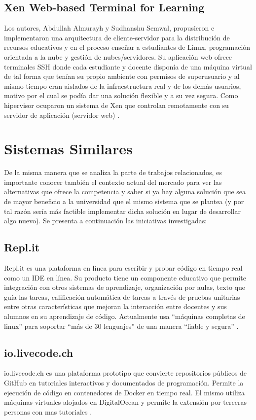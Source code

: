 \subsection{Xen Web-based Terminal for Learning}
Los autores, Abdullah Almurayh y Sudhanshu Semwal, propusieron e implementaron una arquitectura de cliente-servidor para la distribución de recursos educativos y en el proceso enseñar a estudiantes de Linux, programación orientada a la nube y gestión de nubes/servidores. Su aplicación web ofrece terminales SSH donde cada estudiante y docente disponía de una máquina virtual de tal forma que tenían su propio ambiente con permisos de superusuario y al mismo tiempo eran aislados de la infraestructura real y de los demás usuarios, motivo por el cual se podía dar una solución flexible y a su vez segura. Como hipervisor ocuparon un sistema de Xen que controlan remotamente con su servidor de aplicación (servidor web) \citep{almurayh2014xen}.

\section{Sistemas Similares}
De la misma manera que se analiza la parte de trabajos relacionados, es importante conocer también el contexto actual del mercado para ver las alternativas que ofrece la competencia y saber si ya hay alguna solución que sea de mayor beneficio a la universidad que el mismo sistema que se plantea (y por tal razón sería más factible implementar dicha solución en lugar de desarrollar algo nuevo). Se presenta a continuación las iniciativas investigadas:

\subsection{Repl.it}
Repl.it es una plataforma en línea para escribir y probar código en tiempo real como un IDE en línea. Su producto tiene un componente educativo que permite integración con otros sistemas de aprendizaje, organización por aulas, texto que guía las tareas, calificación automática de tareas a través de pruebas unitarias entre otras características que mejoran la interacción entre docentes y sus alumnos en su aprendizaje de código. Actualmente usa “máquinas completas de linux” para soportar “más de 30 lenguajes” de una manera “fiable y segura” \citep{Repl.it-Home}.

\subsection{io.livecode.ch}
io.livecode.ch es una plataforma prototipo que convierte repositorios públicos de GitHub en tutoriales interactivos y documentados de programación. Permite la ejecución de código en contenedores de Docker en tiempo real. El mismo utiliza máquinas virtuales alojados en DigitalOcean y permite la extensión por terceras personas con mas tutoriales \citep{io.livecode.ch}.


